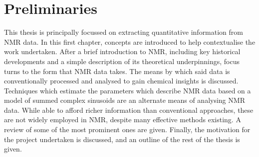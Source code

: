 \chapter{Preliminaries}
\label{chap:intro}
This thesis is principally focussed on extracting quantitative information
from \ac{NMR} data. In this first chapter, concepts are introduced to help
contextualise the work undertaken.
After a brief introduction to \ac{NMR}, including key historical developments
and a simple description of its theoretical underpinnings, focus turns to
the form that \ac{NMR} data takes. The means by which said data is
conventionally processed and analysed to gain chemical insights is discussed.
Techniques which estimate the parameters which describe \ac{NMR} data based on
a model of summed complex sinusoids are an alternate means of analysing
\ac{NMR} data. While able to afford richer information than conventional
approaches, these are not widely employed in \ac{NMR}, despite many effective
methods existing. A review of some of the most prominent ones are given.
Finally, the motivation for the project undertaken is discussed, and an outline of
the rest of the thesis is given.




